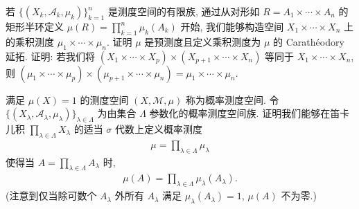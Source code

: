 \documentclass[../../main.tex]{subfiles}
\begin{document}
\begin{exercise}\label{exercise:ch20-13}
若 $\{(X_{k},\mathcal{A}_{k},\mu_{k})\}_{k=1}^{n}$ 是测度空间的有限族, 通过从对形如 $R=A_{1}\times\cdots\times A_{n}$ 的矩形半环定义 $\mu(R)=\prod_{k=1}^{n}\mu_{k}(A_{k})$ 开始, 我们能够构造空间 $X_{1}\times\cdots\times X_{n}$ 上的乘积测度 $\mu_{1}\times\cdots\times\mu_{n}$. 证明 $\mu$ 是预测度且定义乘积测度为 $\mu$ 的 Carath\'eodory 延拓. 证明: 若我们将 $(X_{1}\times\cdots\times X_{p})\times(X_{p+1}\times\cdots\times X_{n})$ 等同于 $X_{1}\times\cdots\times X_{n}$, 则 $(\mu_{1}\times\cdots\times\mu_{p})\times(\mu_{p+1}\times\cdots\times\mu_{n})=\mu_{1}\times\cdots\times\mu_{n}$.
\end{exercise}

\begin{exercise}\label{exercise:ch20-14}
满足 $\mu(X)=1$ 的测度空间 $(X,\mathcal{M},\mu)$ 称为概率测度空间. 令 $\{(X_{\lambda},\mathcal{A}_{\lambda},\mu_{\lambda})\}_{\lambda\in\Lambda}$ 为由集合 $\Lambda$ 参数化的概率测度空间族. 证明我们能够在笛卡儿积 $\prod_{\lambda\in\Lambda}X_{\lambda}$ 的适当 $\sigma$ 代数上定义概率测度
\begin{align*}
\mu=\prod_{\lambda\in\Lambda}\mu_{\lambda}
\end{align*}
使得当 $A=\prod_{\lambda\in\Lambda}A_{\lambda}$ 时,
\begin{align*}
\mu(A)=\prod_{\lambda\in\Lambda}\mu_{\lambda}(A_{\lambda}).
\end{align*}
(注意到仅当除可数个 $A_{\lambda}$ 外所有 $A_{\lambda}$ 满足 $\mu_{\lambda}(A_{\lambda})=1$, $\mu(A)$ 不为零.)
\end{exercise}
\end{document}
